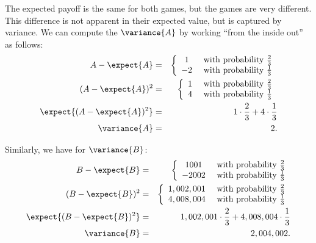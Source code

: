 The expected payoff is the same for both games, but the games are very
different.  This difference is not apparent in their expected value,
but is captured by variance.  We can compute the $\variance{A}$ by
working ``from the inside out'' as follows:
\begin{eqnarray*}
A - \expect{A}
        & = &   \left\{
                \begin{array}{cl}
                        1 & \text{ with probability } \frac{2}{3} \\
                        -2 & \text{ with probability } \frac{1}{3}
                \end{array}
                \right. \\
(A - \expect{A})^2
        & = &   \left\{
                \begin{array}{cl}
                        1 & \text{ with probability } \frac{2}{3} \\
                        4 & \text{ with probability } \frac{1}{3}
                \end{array}
                \right. \\
\expect{(A - \expect{A})^2}
        & = &   1 \cdot \frac{2}{3} + 4 \cdot \frac{1}{3} \\
\variance{A} & = & 2.
\end{eqnarray*}

Similarly, we have for $\variance{B}$:
\begin{eqnarray*}
B - \expect{B}
        & = &   \left\{
                \begin{array}{cl}
                        1001 & \text{ with probability } \frac{2}{3} \\
                        -2002 & \text{ with probability } \frac{1}{3}
                \end{array}
                \right. \\
(B - \expect{B})^2
        & = &   \left\{
                \begin{array}{cl}
                        1,002,001 & \text{ with probability } \frac{2}{3} \\
                        4,008,004 & \text{ with probability } \frac{1}{3}
                \end{array}
                \right. \\
\expect{(B - \expect{B})^2}
        & = &   1,002,001 \cdot \frac{2}{3} + 4,008,004 \cdot \frac{1}{3} \\
\variance{B} & = & 2,004,002.
\end{eqnarray*}

